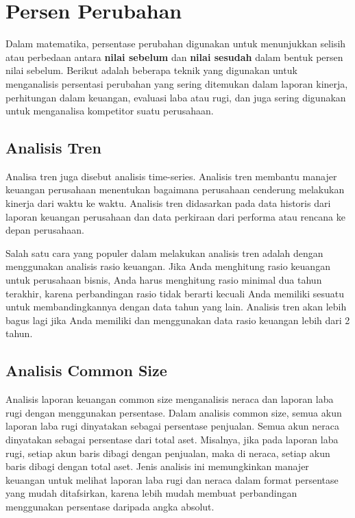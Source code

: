 \documentclass[
]{book}
\begin{document}
\hypertarget{persen-perubahan}{%
\section{Persen Perubahan}\label{persen-perubahan}}

Dalam matematika, persentase perubahan digunakan untuk menunjukkan selisih atau perbedaan antara \textbf{nilai sebelum} dan \textbf{nilai sesudah} dalam bentuk persen nilai sebelum. Berikut adalah beberapa teknik yang digunakan untuk menganalisis persentasi perubahan yang sering ditemukan dalam laporan kinerja, perhitungan dalam keuangan, evaluasi laba atau rugi, dan juga sering digunakan untuk menganalisa kompetitor suatu perusahaan.

\hypertarget{analisis-tren}{%
\subsection{Analisis Tren}\label{analisis-tren}}

Analisa tren juga disebut analisis time-series. Analisis tren membantu manajer keuangan perusahaan menentukan bagaimana perusahaan cenderung melakukan kinerja dari waktu ke waktu. Analisis tren didasarkan pada data historis dari laporan keuangan perusahaan dan data perkiraan dari performa atau rencana ke depan perusahaan.

Salah satu cara yang populer dalam melakukan analisis tren adalah dengan menggunakan analisis rasio keuangan. Jika Anda menghitung rasio keuangan untuk perusahaan bisnis, Anda harus menghitung rasio minimal dua tahun terakhir, karena perbandingan rasio tidak berarti kecuali Anda memiliki sesuatu untuk membandingkannya dengan data tahun yang lain. Analisis tren akan lebih bagus lagi jika Anda memiliki dan menggunakan data rasio keuangan lebih dari 2 tahun.

\hypertarget{analisis-common-size}{%
\subsection{Analisis Common Size}\label{analisis-common-size}}

Analisis laporan keuangan common size menganalisis neraca dan laporan laba rugi dengan menggunakan persentase. Dalam analisis common size, semua akun laporan laba rugi dinyatakan sebagai persentase penjualan. Semua akun neraca dinyatakan sebagai persentase dari total aset. Misalnya, jika pada laporan laba rugi, setiap akun baris dibagi dengan penjualan, maka di neraca, setiap akun baris dibagi dengan total aset. Jenis analisis ini memungkinkan manajer keuangan untuk melihat laporan laba rugi dan neraca dalam format persentase yang mudah ditafsirkan, karena lebih mudah membuat perbandingan menggunakan persentase daripada angka absolut.
\end{document}
